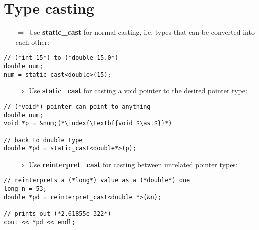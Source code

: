 \documentclass[10pt]{article}
\begin{document}
\section{Type casting}
\small
\begin{enumerate}
\item[$\Rightarrow$] Use \textbf{static\_cast} for normal casting, i.e. types that can be converted into each other:
\end{enumerate}
\begin{lstlisting}
// (*int 15*) to (*double 15.0*)
double num;
num = static_cast<double>(15);
\end{lstlisting}
\begin{enumerate}
\item[$\Rightarrow$] Use \textbf{static\_cast} for casting a void pointer to the desired pointer type:
\end{enumerate}
\begin{lstlisting}
// (*void*) pointer can point to anything
double num;
void *p = &num;(*\index{\textbf{void $\ast$}}*) 

// back to double type
double *pd = static_cast<double*>(p);
\end{lstlisting}
\begin{enumerate}
\item[$\Rightarrow$] Use \textbf{reinterpret\_cast} for casting between unrelated pointer types:
\end{enumerate}
\begin{lstlisting}
// reinterprets a (*long*) value as a (*double*) one
long n = 53;
double *pd = reinterpret_cast<double *>(&n);

// prints out (*2.61855e-322*)
cout << *pd << endl;

\end{lstlisting}
%
%
\end{document}
